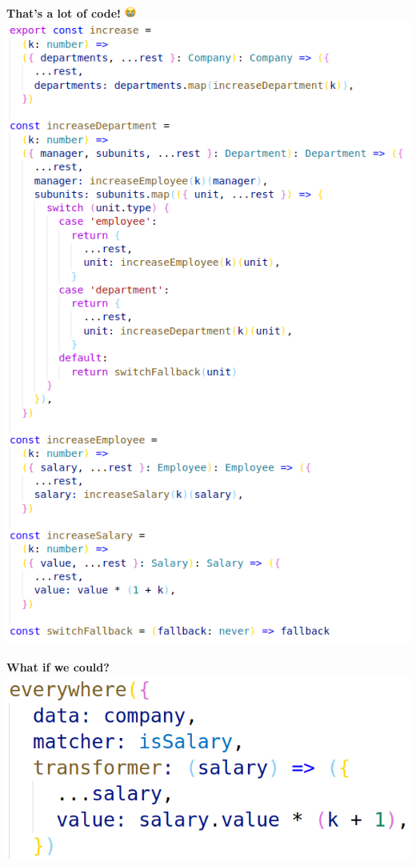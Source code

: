 \documentclass[14pt]{beamer}
\begin{document}
\begin{frame}
    \centering\textbf{That's a lot of code!} \includegraphics[height=1em,width=1em,keepaspectratio]{graphics/cries.png}
  \vfill
  \includegraphics[height=0.8\textheight,width=\textwidth,keepaspectratio]{graphics/increase-naive-ts.png}
\end{frame}

\begin{frame}
  \centering\textbf{What if we could?}
  \vfill
  \includegraphics[height=0.8\textheight,width=\textwidth,keepaspectratio]{graphics/increase-slim-ts.png}
\end{frame}
\end{document}
